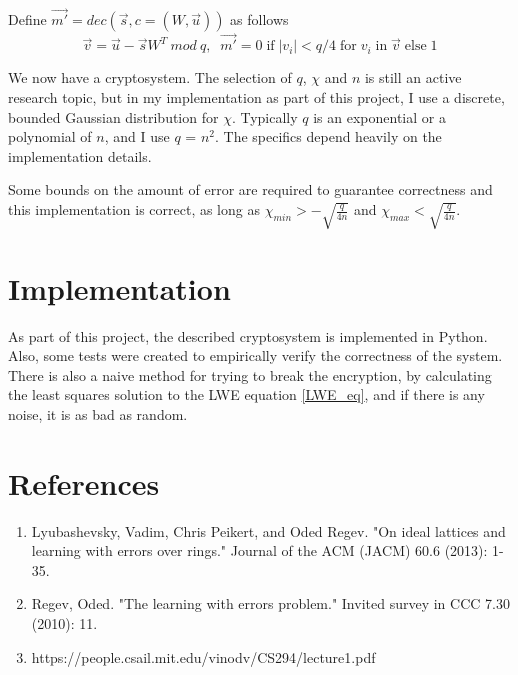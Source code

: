 \documentclass[12pt]{article}
\begin{document}
\noindent Define $\Vec{m'} = dec(\Vec{s},c=(W,\Vec{u}))$ as follows
\begin{equation}
    \label{eq:decode}
    \Vec{v} = \Vec{u} - \Vec{s}W^T\:mod\:q, \;\;
    \Vec{m'} = 0 \;\text{if}\; |v_i| < q /4 \;\text{for}\; v_i \;\text{in}\; \Vec{v} \;\text{else}\; 1
\end{equation}

\noindent We now have a cryptosystem. The selection of $q$, $\chi$ and $n$ is still an active research topic, but in my implementation as part of this project, I use a discrete, bounded Gaussian distribution for $\chi$. Typically $q$ is an exponential or a polynomial of $n$, and I use $q$ = $n^2$. The specifics depend heavily on the implementation details.

\noindent Some bounds on the amount of error are required to guarantee correctness and this implementation is correct, as long as $\chi_{min} > -\sqrt{\frac{q}{4n}}$ and $\chi_{max} < \sqrt{\frac{q}{4n}}$.



\section{Implementation}
\noindent As part of this project, the described cryptosystem is implemented in Python. Also, some tests were created to empirically verify the correctness of the system. There is also a naive method for trying to break the encryption, by calculating the least squares solution to the LWE equation \ref{LWE_eq}, and if there is any noise, it is as bad as random.

\section{References}
\begin{enumerate}
\item Lyubashevsky, Vadim, Chris Peikert, and Oded Regev. "On ideal lattices and learning with errors over rings." Journal of the ACM (JACM) 60.6 (2013): 1-35.

\item Regev, Oded. "The learning with errors problem." Invited survey in CCC 7.30 (2010): 11.

\item https://people.csail.mit.edu/vinodv/CS294/lecture1.pdf

\end{enumerate}
\end{document}
